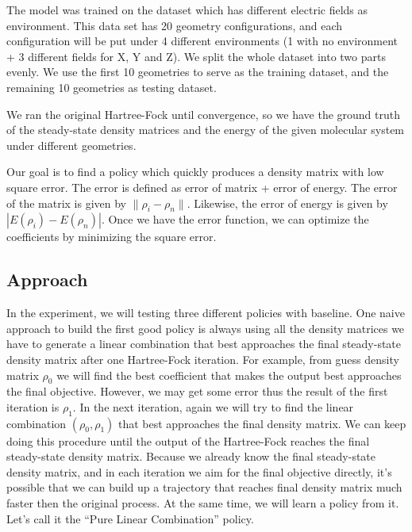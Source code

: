 \documentclass[twoside]{article}
\begin{document}
The model was trained on the dataset which has different electric fields as environment. This data set has 20 geometry configurations, and each configuration will be put under 4 different environments (1 with no environment + 3 different fields for X, Y and Z).  We split the whole dataset into two parts evenly. We use the first 10 geometries to serve as the training dataset, and the remaining 10 geometries as testing dataset.

We ran the original Hartree-Fock until convergence, so we have the ground truth of the steady-state density matrices and the energy of the given molecular system under different geometries. 

Our goal is to find a policy which quickly produces a density matrix with low square error. The error is defined as error of matrix + error of energy. The error of the matrix is given by $\|\rho_i-\rho_n\|$. Likewise, the error of energy is given by $|E(\rho_i)-E(\rho_n)|$. Once we have the error function, we can optimize the coefficients by minimizing the square error.



\subsection{Approach}


In the experiment, we will testing three different policies with baseline.
One naive approach to build the first good policy is always using all the density matrices we have to generate a linear combination that best approaches the final steady-state density matrix after one Hartree-Fock iteration.  For example, from guess density matrix $\rho_0$ we will find the best coefficient that makes the output best approaches the final objective. However, we may get some error thus the result of the first iteration is $\rho_1$.  In the next iteration, again we will try to find the linear combination $(\rho_0, \rho_1)$ that best approaches the final density matrix. We can keep doing this procedure until the output of the Hartree-Fock reaches the final steady-state density matrix.
Because we already know the final steady-state density matrix, and in each iteration we aim for the final objective directly, it's possible that we can build up a trajectory that reaches final density matrix much faster then the original process. At the same time, we will learn a policy from it. Let's call it the ``Pure Linear Combination'' policy.
\end{document}
